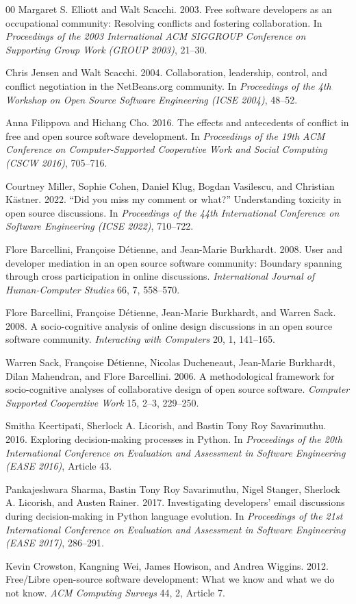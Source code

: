 \documentclass[sigconf,screen]{acmart}
\begin{document}
\begin{thebibliography}{00}
Margaret S. Elliott and Walt Scacchi. 2003. Free software developers as an occupational community: Resolving conflicts and fostering collaboration. In \emph{Proceedings of the 2003 International ACM SIGGROUP Conference on Supporting Group Work (GROUP 2003)}, 21--30.

Chris Jensen and Walt Scacchi. 2004. Collaboration, leadership, control, and conflict negotiation in the NetBeans.org community. In \emph{Proceedings of the 4th Workshop on Open Source Software Engineering (ICSE 2004)}, 48--52.

Anna Filippova and Hichang Cho. 2016. The effects and antecedents of conflict in free and open source software development. In \emph{Proceedings of the 19th ACM Conference on Computer-Supported Cooperative Work and Social Computing (CSCW 2016)}, 705--716.

Courtney Miller, Sophie Cohen, Daniel Klug, Bogdan Vasilescu, and Christian K\"astner. 2022. ``Did you miss my comment or what?'' Understanding toxicity in open source discussions. In \emph{Proceedings of the 44th International Conference on Software Engineering (ICSE 2022)}, 710--722.

Flore Barcellini, Fran\c{c}oise D\'etienne, and Jean-Marie Burkhardt. 2008. User and developer mediation in an open source software community: Boundary spanning through cross participation in online discussions. \emph{International Journal of Human-Computer Studies} 66, 7, 558--570.

Flore Barcellini, Fran\c{c}oise D\'etienne, Jean-Marie Burkhardt, and Warren Sack. 2008. A socio-cognitive analysis of online design discussions in an open source software community. \emph{Interacting with Computers} 20, 1, 141--165.

Warren Sack, Fran\c{c}oise D\'etienne, Nicolas Ducheneaut, Jean-Marie Burkhardt, Dilan Mahendran, and Flore Barcellini. 2006. A methodological framework for socio-cognitive analyses of collaborative design of open source software. \emph{Computer Supported Cooperative Work} 15, 2--3, 229--250.

Smitha Keertipati, Sherlock A. Licorish, and Bastin Tony Roy Savarimuthu. 2016. Exploring decision-making processes in Python. In \emph{Proceedings of the 20th International Conference on Evaluation and Assessment in Software Engineering (EASE 2016)}, Article 43.

Pankajeshwara Sharma, Bastin Tony Roy Savarimuthu, Nigel Stanger, Sherlock A. Licorish, and Austen Rainer. 2017. Investigating developers' email discussions during decision-making in Python language evolution. In \emph{Proceedings of the 21st International Conference on Evaluation and Assessment in Software Engineering (EASE 2017)}, 286--291.

Kevin Crowston, Kangning Wei, James Howison, and Andrea Wiggins. 2012. Free/Libre open-source software development: What we know and what we do not know. \emph{ACM Computing Surveys} 44, 2, Article 7.

\end{thebibliography}
\end{document}
